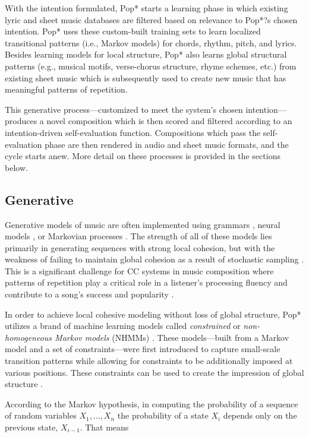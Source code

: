 \documentclass[phd,electronic,oneside,twosidetoc,letterpaper,chaptercenter,parttop,lol,lof,lot]{byumsphd}
\begin{document}
With the intention formulated, Pop* starts a learning phase in which existing lyric and sheet music databases are filtered based on relevance to Pop*?s chosen intention. Pop* uses these custom-built training sets to learn localized transitional patterns (i.e., Markov models) for chords, rhythm, pitch, and lyrics. Besides learning models for local structure, Pop* also learns global structural patterns (e.g., musical motifs, verse-chorus structure, rhyme schemes, etc.) from existing sheet music which is subsequently used to create new music that has meaningful patterns of repetition.

This generative process---customized to meet the system's chosen intention---produces a novel composition which is then scored and filtered according to an intention-driven self-evaluation function. Compositions which pass the self-evaluation phase are then rendered in audio and sheet music formats, and the cycle starts anew. More detail on these processes is provided in the sections below.

\subsection{Generative}

Generative models of music are often implemented using grammars \citep{steedman1984generative}, neural models \citep{Jaques2016}, or Markovian processes \citep{conklin1995multiple}. The strength of all of these models lies primarily in generating sequences with strong local cohesion, but with the weakness of failing to maintain global cohesion as a result of stochastic sampling \citep{Jaques2016}. This is a significant challenge for CC systems in music composition where patterns of repetition play a critical role in a listener's processing fluency and contribute to a song's success and popularity \citep{Nunes2014}.

In order to achieve local cohesive modeling without loss of global structure, Pop* utilizes a brand of machine learning models called \textit{constrained} or \textit{non-homogeneous Markov models} (NHMMs) \citep{pachet2011finite-lengthConstraints}. These models---built from a Markov model and a set of constraints---were first introduced to capture small-scale transition patterns while allowing for constraints to be additionally imposed at various positions. These constraints can be used to create the impression of global structure \citep{Barbieri2012MarkovStyle}.

According to the Markov hypothesis, in computing the probability of a sequence of random variables $X_1,\dots,X_n$ the probability of a state $X_i$ depends only on the previous state, $X_{i-1}$. That means
\end{document}
